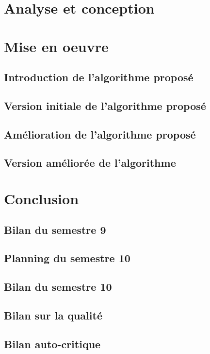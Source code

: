 \documentclass{polytech/polytech}
\begin{document}
    \chapter{Analyse et conception}
    
    \chapter{Mise en oeuvre}
    
        \section{Introduction de l'algorithme proposé}
        \section{Version initiale de l'algorithme proposé}
        \section{Amélioration de l'algorithme proposé}
        \section{Version améliorée de l'algorithme}
    
    \chapter{Conclusion}
    
        \section{Bilan du semestre 9}
        \section{Planning du semestre 10}
        \section{Bilan du semestre 10}
        \section{Bilan sur la qualité}
        \section{Bilan auto-critique}
    
\end{document}
